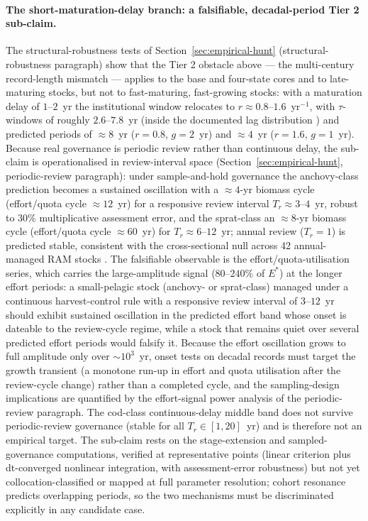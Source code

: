 \documentclass[twocolumn,10pt]{article}
\begin{document}
\paragraph{The short-maturation-delay branch: a falsifiable, decadal-period Tier 2 sub-claim.} The structural-robustness tests of Section~\ref{sec:empirical-hunt} (structural-robustness paragraph) show that the Tier 2 obstacle above --- the multi-century record-length mismatch --- applies to the base and four-state cores and to late-maturing stocks, but not to fast-maturing, fast-growing stocks: with a maturation delay of $1$--$2$~yr the institutional window relocates to $r\approx0.8$--$1.6$~yr$^{-1}$, with $\tau$-windows of roughly $2.6$--$7.8$~yr (inside the documented lag distribution \cite{hocherman2025}) and predicted periods of $\approx8$~yr ($r=0.8$, $g=2$~yr) and $\approx4$~yr ($r=1.6$, $g=1$~yr). Because real governance is periodic review rather than continuous delay, the sub-claim is operationalised in review-interval space (Section~\ref{sec:empirical-hunt}, periodic-review paragraph): under sample-and-hold governance the anchovy-class prediction becomes a sustained oscillation with a $\approx4$-yr biomass cycle (effort/quota cycle $\approx12$~yr) for a responsive review interval $T_r\approx3$--$4$~yr, robust to $30\%$ multiplicative assessment error, and the sprat-class an $\approx8$-yr biomass cycle (effort/quota cycle $\approx60$~yr) for $T_r\approx6$--$12$~yr; annual review ($T_r=1$) is predicted stable, consistent with the cross-sectional null across 42 annual-managed RAM stocks \cite{ricard2012}. The falsifiable observable is the effort/quota-utilisation series, which carries the large-amplitude signal ($80$--$240\%$ of $E^*$) at the longer effort periods: a small-pelagic stock (anchovy- or sprat-class) managed under a continuous harvest-control rule with a responsive review interval of $3$--$12$~yr should exhibit sustained oscillation in the predicted effort band whose onset is dateable to the review-cycle regime, while a stock that remains quiet over several predicted effort periods would falsify it. Because the effort oscillation grows to full amplitude only over $\sim10^3$~yr, onset tests on decadal records must target the growth transient (a monotone run-up in effort and quota utilisation after the review-cycle change) rather than a completed cycle, and the sampling-design implications are quantified by the effort-signal power analysis of the periodic-review paragraph. The cod-class continuous-delay middle band does not survive periodic-review governance (stable for all $T_r\in[1,20]$~yr) and is therefore not an empirical target. The sub-claim rests on the stage-extension and sampled-governance computations, verified at representative points (linear criterion plus dt-converged nonlinear integration, with assessment-error robustness) but not yet collocation-classified or mapped at full parameter resolution; cohort resonance predicts overlapping periods, so the two mechanisms must be discriminated explicitly in any candidate case.
\end{document}
